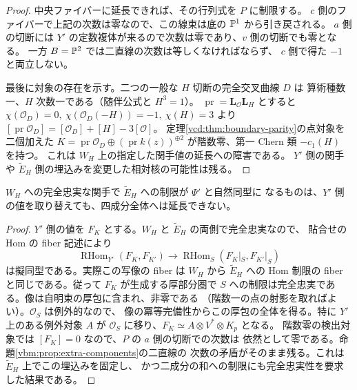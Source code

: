 \begin{proof}
中央ファイバーに延長できれば、その行列式を $P$ に制限する。
$c$ 側のファイバーで上記の次数は零なので、この線束は底の $\mathbb P^1$ から引き戻される。
$a$ 側の切断には $Y'$ の定数複体が来るので次数は零であり、$v$ 側の切断でも零となる。
一方 $B=\mathbb P^2$ では二直線の次数は等しくなければならず、
$c$ 側で得た $-1$ と両立しない。

最後に対象の存在を示す。二つの一般な $H$ 切断の完全交叉曲線 $D$ は
算術種数一、$H$ 次数一である（随伴公式と $H^3=1$）。
$\operatorname{pr}=\mathbf L_{\mathcal O}\mathbf L_H$ とすると
$\chi(\mathcal O_D)=0,\ \chi(\mathcal O_D(-H))=-1,\ \chi(H)=3$ より
$[\operatorname{pr}\mathcal O_D]=[\mathcal O_D]+[H]-3[\mathcal O]$。
定理\ref{vcd:thm:boundary-parity}の点対象を二個加えた
$K=\operatorname{pr}\mathcal O_D\oplus(\operatorname{pr} k(z))^{\oplus2}$
が階数零、第一 Chern 類 $-c_1(H)$ を持つ。
これは $W_H$ 上の指定した関手値の延長への障害である。
$Y'$ 側の関手や $\widetilde E_H$ 側の埋込みを変更した相対核の可能性は残る。
\end{proof}

\begin{corollary}\label{vbm:cor:rigid-side}
$W_H$ への完全忠実な関手で $\widetilde E_H$ への制限が $\Psi'$ と自然同型に
なるものは、$Y'$ 側の値を取り替えても、四成分全体へは延長できない。
\end{corollary}
\begin{proof}
$Y'$ 側の値を $F_K$ とする。$W_H$ と $\widetilde E_H$ の両側で完全忠実なので、
貼合せの Hom の fiber 記述により
\[
 \operatorname{RHom}_{Y'}(F_K,F_{K'})\longrightarrow
 \operatorname{RHom}_{S}(F_K|_S,F_{K'}|_S)
\]
は擬同型である。実際この写像の fiber は $W_H$ から $\widetilde E_H$ への
Hom 制限の fiber と同じである。従って $F_K$ が生成する厚部分圏で
$S$ への制限は完全忠実である。像は自明束の厚包に含まれ、非零である
（階数一の点の射影を取ればよい）。$\mathcal O_S$ は例外的なので、
像の冪等完備性からこの厚包の全体を得る。特に $Y'$ 上のある例外対象 $A$
が $\mathcal O_S$ に移り、$F_K\simeq A\otimes V^*\otimes K_p$ となる。
階数零の検出対象では $[F_K]=0$ なので、$P$ の $a$ 側の切断での次数は
依然として零である。命題\ref{vbm:prop:extra-components}の二直線の
次数の矛盾がそのまま残る。これは $\widetilde E_H$ 上でこの埋込みを固定し、
かつ二成分の和への制限にも完全忠実性を要求した結果である。
\end{proof}

